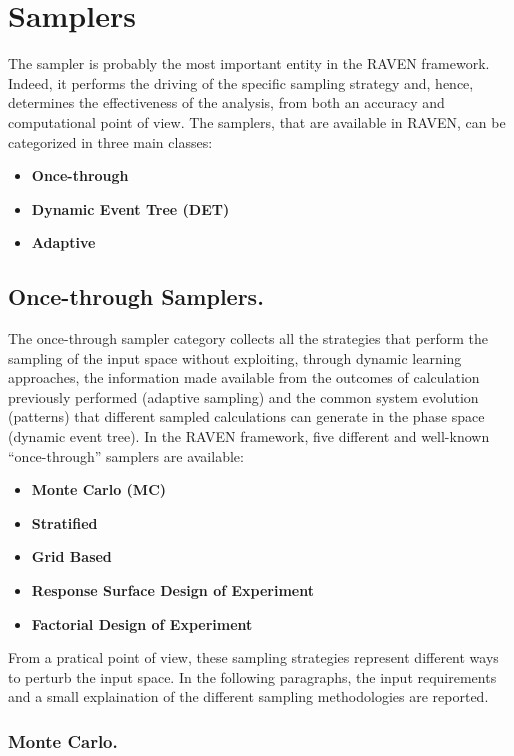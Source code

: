 \section{Samplers  \\ \vspace{2 mm} {\small }}
\label{sec:Samplers}
The sampler is probably the most important entity in the RAVEN framework. Indeed, it performs the driving of the specific sampling strategy and, hence, determines the effectiveness of the analysis, from both an accuracy and computational point of view.  The samplers, that are available in RAVEN, can be categorized in three main classes:
\begin{itemize}
\item \textbf{Once-through}
\item \textbf{Dynamic Event Tree (DET)}
\item \textbf{Adaptive}
\end{itemize}
\subsection{Once-through Samplers.}
\label{subsec:onceThroughSamplers}
The once-through sampler category collects all the strategies that perform the sampling of the input space without exploiting, through dynamic learning approaches, the information made available from the outcomes of calculation previously performed (adaptive sampling) and the common system evolution (patterns) that different sampled calculations can generate in the phase space (dynamic event tree). 
In the RAVEN framework, five different and well-known “once-through” samplers are available: 
\begin{itemize}
\item \textbf{Monte Carlo (MC)}
\item \textbf{Stratified}
\item \textbf{Grid Based}
\item \textbf{Response Surface Design of Experiment}
\item \textbf{Factorial Design of Experiment}
\end{itemize}
From a pratical point of view, these sampling strategies represent different ways to perturb the input space. In the following paragraphs, the input requirements and a small explaination of the different sampling methodologies are reported.
\subsubsection{Monte Carlo.}
\label{subsubsubsec:MC}








